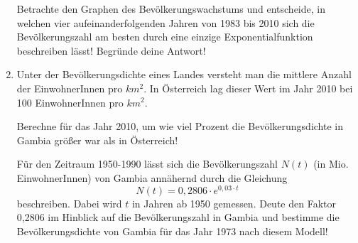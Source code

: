 \begin{langesbeispiel}
\begin{enumerate}
 Betrachte den Graphen des Bevölkerungswachstums und entscheide, in welchen vier aufeinanderfolgenden Jahren von 1983 bis 2010 sich die Bevölkerungszahl am besten durch eine einzige Exponentialfunktion beschreiben lässt! Begründe deine Antwort!

\item Unter der Bevölkerungsdichte eines Landes versteht man die mittlere Anzahl der EinwohnerInnen pro $km^2$. In Österreich lag dieser Wert im Jahr 2010 bei 100 EinwohnerInnen pro $km^2$.

 Berechne für das Jahr 2010, um wie viel Prozent die Bevölkerungsdichte in Gambia  größer war als in Österreich!

Für den Zeitraum 1950-1990 lässt sich die Bevölkerungszahl $N(t)$ (in Mio. EinwohnerInnen) von Gambia annähernd durch die Gleichung 
$$N(t)= 0,2806\cdot e^{0,03\cdot t}$$
 beschreiben. Dabei wird $t$ in Jahren ab 1950 gemessen. Deute den Faktor 0,2806 im Hinblick auf die Bevölkerungszahl in Gambia und bestimme die Bevölkerungsdichte von Gambia für das Jahr 1973 nach diesem Modell!
						\end{enumerate}\leer
				
\end{langesbeispiel}
